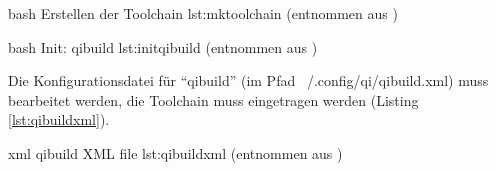                     {bash}
                    {Erstellen der Toolchain}
                    {lst:mktoolchain}
        (entnommen aus \cite[S. 7]{projss15})

                    {bash}
                    {Init: qibuild}
                    {lst:initqibuild}
        (entnommen aus \cite[S. 8, f.]{projss15})

        Die Konfigurationsdatei für ``qibuild''
        (im Pfad ~/.config/qi/qibuild.xml) muss bearbeitet werden, die
        Toolchain muss eingetragen werden (Listing \ref{lst:qibuildxml}).

                    {xml}
                    {qibuild XML file}
                    {lst:qibuildxml}
        (entnommen aus \cite[S. 8]{projss15})

